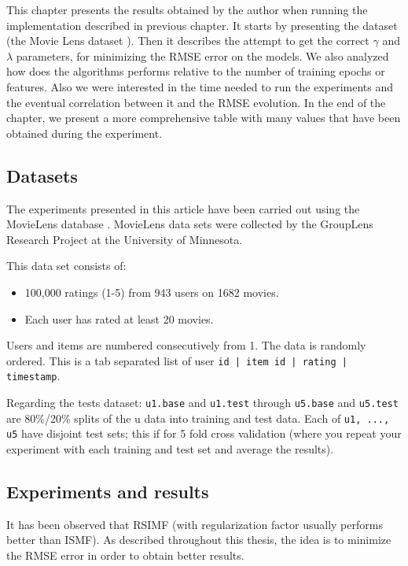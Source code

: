 \documentclass[11pt]{amsart}
\begin{document}
This chapter presents the results obtained by the author when running the implementation described in previous chapter. It starts by presenting the dataset (the Movie Lens dataset \cite{MOVIELENS-DATA}). Then it describes the attempt to get the correct $\gamma$ and $\lambda$ parameters, for minimizing the RMSE error on the models. We also analyzed how does the algorithms performs relative to the number of training epochs or features. Also we were interested in the time needed to run the experiments and the eventual correlation between it and the RMSE evolution. In the end of the chapter, we present a more comprehensive table with many values that have been obtained during the experiment.

\subsection{Datasets}
\label{datasets}

The experiments presented in this article have been carried out using the MovieLens database \cite{MOVIELENS-DATA}. MovieLens data sets were collected by the GroupLens Research Project at the University of Minnesota.
 
This data set consists of:
\begin{itemize}
	\item 100,000 ratings (1-5) from 943 users on 1682 movies. 
	\item Each user has rated at least 20 movies. 
\end{itemize}

Users and items are numbered consecutively from 1. The data is randomly ordered. This is a tab separated list of user \texttt{id | item id | rating | timestamp}.

Regarding the tests dataset: \texttt{u1.base} and \texttt{u1.test} through \texttt{u5.base} and \texttt{u5.test} are 80\%/20\% splits of the u data into training and test data. Each of \texttt{u1, ..., u5} have disjoint test sets; this if for 5 fold cross validation (where you repeat your experiment with each training and test set and average the results).

\subsection{Experiments and results}

It has been observed that RSIMF (with regularization factor usually performs better than ISMF). As described throughout this thesis, the idea is to minimize the RMSE error in order to obtain better results. 
\end{document}
